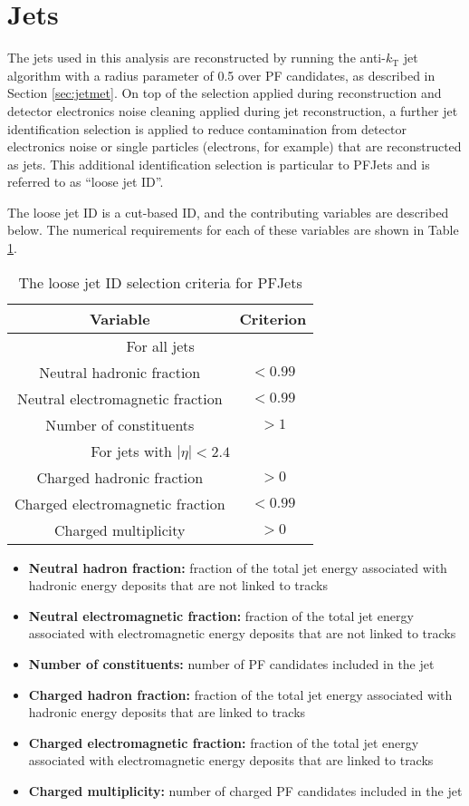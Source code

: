 \section{Jets}

The jets used in this analysis are reconstructed
by running the anti-$k_{\text{T}}$ jet algorithm with a 
radius parameter of 0.5 over PF candidates, as described in Section
\ref{sec:jetmet}.  On top of the selection applied during 
reconstruction and detector electronics noise cleaning applied during jet reconstruction, 
a further jet identification selection is applied to reduce contamination from detector electronics noise or
single particles (electrons, for example) that are reconstructed as jets.
This additional identification selection is particular to PFJets 
and is referred to as ``loose jet ID''.

The loose jet ID is a cut-based ID, and the contributing variables are 
described below.
The numerical requirements for each of these variables are shown
in Table \ref{tab:jetid}.

\begin{table}
  \centering
  \begin{tabular}{c|c}
    Variable & Criterion \\
    \hline\hline
    \multicolumn{2}{c}{For all jets} \\
    \hline
    Neutral hadronic fraction & $<0.99$ \\
    Neutral electromagnetic fraction & $<0.99$ \\
    Number of constituents & $> 1$ \\
    \hline
    \multicolumn{2}{c}{For jets with $|\eta| < 2.4$} \\
    \hline
    Charged hadronic fraction & $>0$ \\
    Charged electromagnetic fraction & $<0.99$ \\
    Charged multiplicity & $>0$ \\
  \end{tabular}
  \caption{The loose jet ID selection criteria for PFJets}
  \label{tab:jetid}
\end{table}

\begin{itemize}
  \item {\bf Neutral hadron fraction:} fraction of the total jet energy associated with hadronic energy deposits that are not linked to tracks
  \item {\bf Neutral electromagnetic fraction:} fraction of the total jet energy associated with electromagnetic energy deposits that are not linked to tracks
  \item {\bf Number of constituents:} number of PF candidates included in the jet
  \item {\bf Charged hadron fraction:} fraction of the total jet energy associated with hadronic energy deposits that are linked to tracks
  \item {\bf Charged electromagnetic fraction:} fraction of the total jet energy associated with electromagnetic energy deposits that are linked to tracks
  \item {\bf Charged multiplicity:} number of charged PF candidates included in the jet
\end{itemize}

